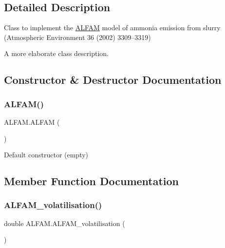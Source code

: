 \subsection{Detailed Description}
Class to implement the \mbox{\hyperlink{class_a_l_f_a_m}{A\+L\+F\+AM}} model of ammonia emission from slurry (Atmospheric Environment 36 (2002) 3309–3319) 

A more elaborate class description.

\subsection{Constructor \& Destructor Documentation}
\mbox{\label{class_a_l_f_a_m_a906de2a7e6a63d037313aecb092e08fa}} 
\subsubsection{\texorpdfstring{ALFAM()}{ALFAM()}}
{\footnotesize\ttfamily A\+L\+F\+A\+M.\+A\+L\+F\+AM (\begin{DoxyParamCaption}{ }\end{DoxyParamCaption})\hspace{0.3cm}{\ttfamily [inline]}}



Default constructor (empty) 



\subsection{Member Function Documentation}
\mbox{\label{class_a_l_f_a_m_a74f67c0b90bec2b1423add60999fb332}} 
\subsubsection{\texorpdfstring{ALFAM\_volatilisation()}{ALFAM\_volatilisation()}}
{\footnotesize\ttfamily double A\+L\+F\+A\+M.\+A\+L\+F\+A\+M\+\_\+volatilisation (\begin{DoxyParamCaption}{ }\end{DoxyParamCaption})\hspace{0.3cm}{\ttfamily [inline]}}



